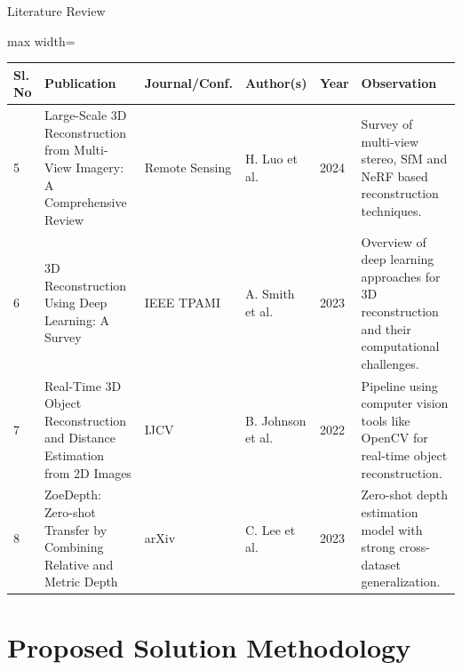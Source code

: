 \documentclass[11pt]{beamer}
\begin{document}
\begin{frame}[allowframebreaks]{Literature Review}
\small

\begin{adjustbox}{max width=\textwidth}
\begin{tabular}{|p{0.8cm}|p{3.5cm}|p{2.5cm}|p{3cm}|p{1.5cm}|p{4cm}|}
\hline
\textbf{Sl. No} &
\textbf{Publication} &
\textbf{Journal/Conf.} &
\textbf{Author(s)} &
\textbf{Year} &
\textbf{Observation} \\
\hline

5 & Large-Scale 3D Reconstruction from Multi-View Imagery: A Comprehensive Review &
Remote Sensing &
H. Luo et al. &
2024 &
Survey of multi-view stereo, SfM and NeRF based reconstruction techniques. \\
\hline

6 & 3D Reconstruction Using Deep Learning: A Survey &
IEEE TPAMI &
A. Smith et al. &
2023 &
Overview of deep learning approaches for 3D reconstruction and their computational challenges. \\
\hline

7 & Real-Time 3D Object Reconstruction and Distance Estimation from 2D Images &
IJCV &
B. Johnson et al. &
2022 &
Pipeline using computer vision tools like OpenCV for real-time object reconstruction. \\
\hline

8 & ZoeDepth: Zero-shot Transfer by Combining Relative and Metric Depth &
arXiv &
C. Lee et al. &
2023 &
Zero-shot depth estimation model with strong cross-dataset generalization. \\
\hline

\end{tabular}
\end{adjustbox}

\end{frame}


\section{Proposed Solution Methodology}
\end{document}

